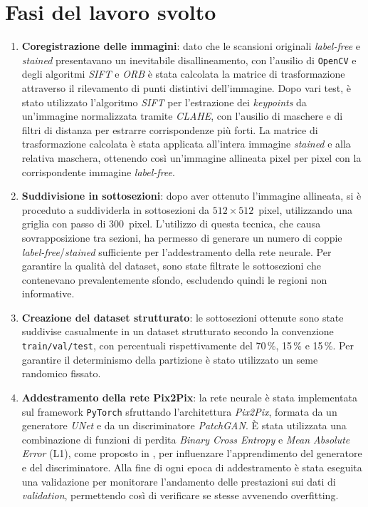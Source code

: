 \documentclass[a4paper,10pt]{article}
\begin{document}
\section{Fasi del lavoro svolto}
\begin{enumerate}
    \item \textbf{Coregistrazione delle immagini}: dato che le scansioni originali \textit{label-free} e \textit{stained} presentavano un inevitabile disallineamento, con l'ausilio di \texttt{OpenCV} \cite{opencv} e degli algoritmi \textit{SIFT} e \textit{ORB} è stata calcolata la matrice di trasformazione attraverso il rilevamento di punti distintivi dell'immagine. Dopo vari test, è stato utilizzato l'algoritmo \textit{SIFT} per l'estrazione dei \textit{keypoints} da un'immagine normalizzata tramite \textit{CLAHE}, con l'ausilio di maschere e di filtri di distanza per estrarre corrispondenze più forti. La matrice di trasformazione calcolata è stata applicata all'intera immagine \textit{stained} e alla relativa maschera, ottenendo così un'immagine allineata pixel per pixel con la corrispondente immagine \textit{label-free}.
    \item \textbf{Suddivisione in sottosezioni}: dopo aver ottenuto l'immagine allineata, si è proceduto a suddividerla in sottosezioni da $512\times512$~pixel, utilizzando una griglia con passo di 300~pixel. L'utilizzo di questa tecnica, che causa sovrapposizione tra sezioni, ha permesso di generare un numero di coppie \textit{label-free}/\textit{stained} sufficiente per l'addestramento della rete neurale. Per garantire la qualità del dataset, sono state filtrate le sottosezioni che contenevano prevalentemente sfondo, escludendo quindi le regioni non informative.
    \item \textbf{Creazione del dataset strutturato}: le sottosezioni ottenute sono state suddivise casualmente in un dataset strutturato secondo la convenzione \texttt{train/val/test}, con percentuali rispettivamente del 70\,\%, 15\,\% e 15\,\%. Per garantire il determinismo della partizione è stato utilizzato un seme randomico fissato.
    \item \textbf{Addestramento della rete Pix2Pix}: la rete neurale è stata implementata sul framework \texttt{PyTorch} \cite{pytorch} sfruttando l'architettura \textit{Pix2Pix}, formata da un generatore \textit{UNet} e da un discriminatore \textit{PatchGAN}. È stata utilizzata una combinazione di funzioni di perdita \textit{Binary Cross Entropy} e \textit{Mean Absolute Error} (L1), come proposto in \cite{isola2017}, per influenzare l'apprendimento del generatore e del discriminatore. Alla fine di ogni epoca di addestramento è stata eseguita una validazione per monitorare l'andamento delle prestazioni sui dati di \textit{validation}, permettendo così di verificare se stesse avvenendo overfitting.
\end{enumerate}
\end{document}
